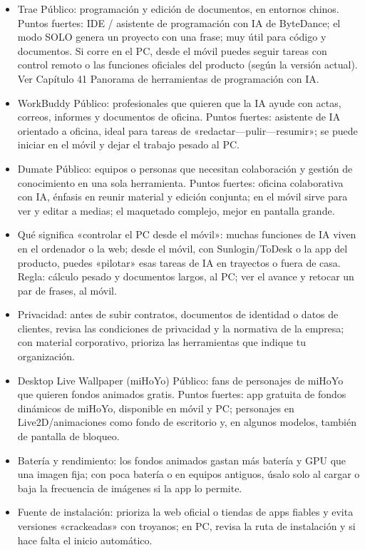 \begin{itemize}
  \item Trae Público: programación y edición de documentos, en entornos chinos. Puntos fuertes: IDE / asistente de programación con IA de ByteDance; el modo SOLO genera un proyecto con una frase; muy útil para código y documentos. Si corre en el PC, desde el móvil puedes seguir tareas con control remoto o las funciones oficiales del producto (según la versión actual). Ver Capítulo 41 Panorama de herramientas de programación con IA.
  \item WorkBuddy Público: profesionales que quieren que la IA ayude con actas, correos, informes y documentos de oficina. Puntos fuertes: asistente de IA orientado a oficina, ideal para tareas de «redactar—pulir—resumir»; se puede iniciar en el móvil y dejar el trabajo pesado al PC.
  \item Dumate Público: equipos o personas que necesitan colaboración y gestión de conocimiento en una sola herramienta. Puntos fuertes: oficina colaborativa con IA, énfasis en reunir material y edición conjunta; en el móvil sirve para ver y editar a medias; el maquetado complejo, mejor en pantalla grande.
  \item Qué significa «controlar el PC desde el móvil»: muchas funciones de IA viven en el ordenador o la web; desde el móvil, con Sunlogin/ToDesk o la app del producto, puedes «pilotar» esas tareas de IA en trayectos o fuera de casa. Regla: cálculo pesado y documentos largos, al PC; ver el avance y retocar un par de frases, al móvil.
  \item Privacidad: antes de subir contratos, documentos de identidad o datos de clientes, revisa las condiciones de privacidad y la normativa de la empresa; con material corporativo, prioriza las herramientas que indique tu organización.
\end{itemize}


\begin{itemize}
  \item Desktop Live Wallpaper (miHoYo) Público: fans de personajes de miHoYo que quieren fondos animados gratis. Puntos fuertes: app gratuita de fondos dinámicos de miHoYo, disponible en móvil y PC; personajes en Live2D/animaciones como fondo de escritorio y, en algunos modelos, también de pantalla de bloqueo.
  \item Batería y rendimiento: los fondos animados gastan más batería y GPU que una imagen fija; con poca batería o en equipos antiguos, úsalo solo al cargar o baja la frecuencia de imágenes si la app lo permite.
  \item Fuente de instalación: prioriza la web oficial o tiendas de apps fiables y evita versiones «crackeadas» con troyanos; en PC, revisa la ruta de instalación y si hace falta el inicio automático.
\end{itemize}

